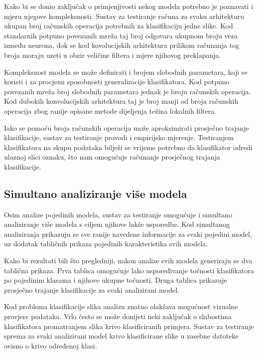 \documentclass[lmodern, utf8, diplomski, numeric]{fer}
\begin{document}
Kako bi se donio zaključak o primjenjivosti nekog modela potrebno je poznavati i mjeru njegove kompleksnosti. Sustav za testiranje računa za svaku arhitekturu ukupan broj računskih operacija potrebnih za klasifikaciju jedne slike. Kod standarnih potpuno povezanih mreža taj broj odgovara ukupnom broju veza između neurona, dok se kod kovolucijskih arhitektura prilikom računanja tog broja moraju uzeti u obzir veličine filtera i mjere njihovog preklapanja. 

Kompleksnost modela se može definirati i brojem slobodnih parametara, koji se koristi i za procjenu sposobnosti generalizacije klasifikatora. Kod potpuno povezanih mreža broj slobodnih parametara jednak je broju računskih operacija. Kod dubokih konvolucijskih arhitektura taj je broj manji od broja računskih operacija zbog ranije opisane metode dijeljenja težina lokalnih filtera. 

Iako se pomoću broja računskih operacija može aproksimirati prosječno trajanje klasifikacije, sustav za testiranje provodi i empirijsko mjerenje. Testiranjem klasifikatora na skupu podataka bilježi se vrijeme potrebno da klasifikator odredi ulaznoj slici oznaku, što nam omogućuje računanje prosječnog trajanja klasifikacije.

\subsection{Simultano analiziranje više modela}

Osim analize pojedinih modela, sustav za testiranje omogućuje i simultano analiziranje više modela s ciljem njihove lakše usporedbe. Kod simultanog analiziranja prikazuju se sve ranije navedene informacije za svaki pojedini model, uz dodatak tabličnih prikaza pojedinih karakteristika svih modela. 

Kako bi rezultati bili što pregledniji, nakon analize svih modela generiraju se dva tablična prikaza. Prva tablica omogućuje lako uspoređivanje točnosti klasifikatora po pojedinim klasama i njihove ukupne točnosti. Druga tablica prikazuje prosječno trajanje klasifikacije za svaki analizirani model. 

Kod problema klasifikacije slika analizu znatno olakšava mogućnost vizualne provjere podataka. Vrlo često se može donijeti neki zaključak o slabostima klasifikatora promatranjem slika krivo klasificiranih primjera. Sustav za testiranje sprema za svaki analizirani model krivo klasificirane slike u zasebne datoteke ovisno o krivo određenoj klasi.
\end{document}
